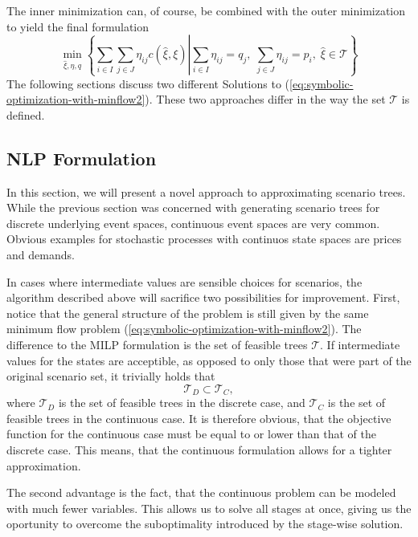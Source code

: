 \documentclass[a4paper, 12pt] {article}
\begin{document}
The inner minimization can, of course, be combined with the outer minimization to yield the final formulation
\begin{equation}
  \label{eq:symbolic-optimization-with-minflow2}
  \min_{\hat{\xi},\eta,q}\left\{\sum_{i\in I}\sum_{j\in J}\eta_{ij}c(\hat{\xi}, \xi)\left|\sum_{i\in I}\eta_{ij}=q_j,\;\sum_{j\in J}\eta_{ij}=p_i,\;\hat{\xi} \in \mathcal{T}\right.\right\}
\end{equation}
The following sections discuss two different Solutions to (\ref{eq:symbolic-optimization-with-minflow2}). These two approaches differ in the way the set $\mathcal{T}$ is defined.


\subsection{NLP Formulation}
In this section, we will present a novel approach to approximating scenario trees. While the previous section was concerned with generating scenario trees for discrete underlying event spaces, continuous event spaces are very common. Obvious examples for stochastic processes with continuos state spaces are prices and demands.

In cases where intermediate values are sensible choices for scenarios, the algorithm described above will sacrifice two possibilities for improvement. First, notice that the general structure of the problem is still given by the same minimum flow problem (\ref{eq:symbolic-optimization-with-minflow2}). The difference to the MILP formulation is the set of feasible trees $\mathcal{T}$. If intermediate values for the states are acceptible, as opposed to only those that were part of the original scenario set, it trivially holds that
\begin{equation}
  \label{eq:T-D-subset-T-C}
  \mathcal{T}_D\subset \mathcal{T}_C,
\end{equation}
where $\mathcal{T}_D$ is the set of feasible trees in the discrete case, and $\mathcal{T}_C$ is the set of feasible trees in the continuous case. It is therefore obvious, that the objective function for the continuous case must be equal to or lower than that of the discrete case. This means, that the continuous formulation allows for a tighter approximation.

The second advantage is the fact, that the continuous problem can be modeled with much fewer variables. This allows us to solve all stages at once, giving us the oportunity to overcome the suboptimality introduced by the stage-wise solution.
\end{document}
